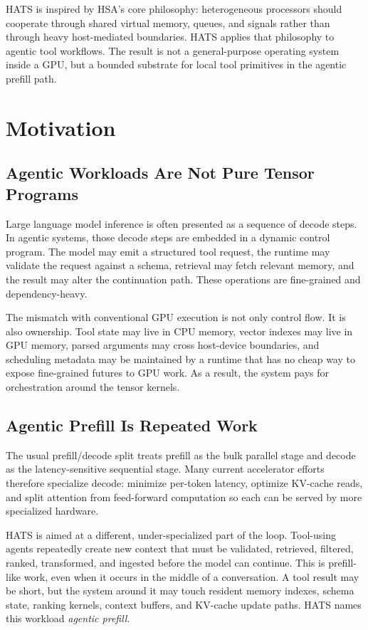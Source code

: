 \documentclass[11pt]{article}
\begin{document}
HATS is inspired by HSA's core philosophy: heterogeneous processors should
cooperate through shared virtual memory, queues, and signals rather than through
heavy host-mediated boundaries. HATS applies that philosophy to agentic tool
workflows. The result is not a general-purpose operating system inside a GPU,
but a bounded substrate for local tool primitives in the agentic prefill path.

\section{Motivation}

\subsection{Agentic Workloads Are Not Pure Tensor Programs}

Large language model inference is often presented as a sequence of decode
steps. In agentic systems, those decode steps are embedded in a dynamic control
program. The model may emit a structured tool request, the runtime may validate
the request against a schema, retrieval may fetch relevant memory, and the
result may alter the continuation path. These operations are fine-grained and
dependency-heavy.

The mismatch with conventional GPU execution is not only control flow. It is
also ownership. Tool state may live in CPU memory, vector indexes may live in
GPU memory, parsed arguments may cross host-device boundaries, and scheduling
metadata may be maintained by a runtime that has no cheap way to expose
fine-grained futures to GPU work. As a result, the system pays for orchestration
around the tensor kernels.

\subsection{Agentic Prefill Is Repeated Work}

The usual prefill/decode split treats prefill as the bulk parallel stage and
decode as the latency-sensitive sequential stage. Many current accelerator
efforts therefore specialize decode: minimize per-token latency, optimize
KV-cache reads, and split attention from feed-forward computation so each can be
served by more specialized hardware.

HATS is aimed at a different, under-specialized part of the loop. Tool-using
agents repeatedly create new context that must be validated, retrieved,
filtered, ranked, transformed, and ingested before the model can continue. This
is prefill-like work, even when it occurs in the middle of a conversation. A
tool result may be short, but the system around it may touch resident memory
indexes, schema state, ranking kernels, context buffers, and KV-cache update
paths. HATS names this workload \emph{agentic prefill}.
\end{document}
